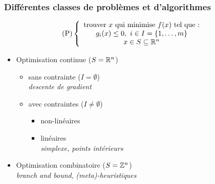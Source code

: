 \documentclass{beamer}
\newcommand{\Z}{{\ensuremath\mathbb{Z}}}
\newcommand{\R}{{\ensuremath\mathbb{R}}}
\begin{document}
\begin{frame}
  \frametitle{Différentes classes de problèmes et d'algorithmes}

  \[
  \text{(P)} \left\{
  \begin{array}{c}
    \text{trouver} \ x \ \text{qui minimise} \ f(x) \ \text{tel que :} \\
    g_i(x) \leq 0, \ i \in I = \{1, \dots, m\} \\
    x \in S \subseteq \R^n
  \end{array}
  \right.
  \]

  \begin{itemize}
  \item Optimisation continue ($S = \R^n$)
    \begin{itemize}
    \item sans contrainte ($I = \emptyset$) \\
      \emph{descente de gradient}
    \item avec contraintes ($I \neq \emptyset$) 
      \begin{itemize}
        \item non-linéaires
        \item linéaires \\
        \emph{simplexe, points intérieurs}
      \end{itemize}
    \end{itemize}
  \item Optimisation combinatoire ($S = \Z^n$)\\
    \emph{branch and bound}, \emph{(meta)-heuristiques} 
  \end{itemize}
  
\end{frame}
\end{document}
